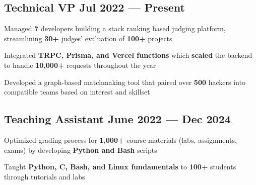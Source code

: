 \subsection{{Technical VP \hfill Jul 2022 --- Present}}
\begin{zitemize}
    \item Managed \textbf{7} developers building a stack ranking based judging platform, streamlining \textbf{30+} judges' evaluation of \textbf{100+} projects
    \item Integrated \textbf{TRPC, Prisma, and Vercel functions} which \textbf{scaled} the backend to handle \textbf{10,000+} requests throughout the year
    \item Developed a graph-based matchmaking tool that paired over \textbf{500} hackers into compatible teams based on interest and skillset
\end{zitemize}


\subsection{{Teaching Assistant \hfill June 2022 --- Dec 2024}}
\begin{zitemize}
    \item Optimized grading process for \textbf{1,000+} course materials (labs, assignments, exams) by developing \textbf{Python and Bash} scripts
    \item Taught \textbf{Python, C, Bash, and Linux fundamentals} to \textbf{100+} students through tutorials and labs
\end{zitemize}





